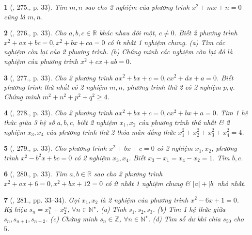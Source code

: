 \documentclass{article}
\newtheorem{baitoan}{}
\begin{document}
\begin{baitoan}[\cite{Binh_Toan_9_tap_2}, 275., p. 33]
	Tìm $m,n$ sao cho 2 nghiệm của phương trình $x^2 + mx + n = 0$ cũng là $m,n$.
\end{baitoan}

\begin{baitoan}[\cite{Binh_Toan_9_tap_2}, 276., p. 33]
	Cho $a,b,c\in\mathbb{R}$ khác nhau đôi một, $c\ne0$. Biết 2 phương trình $x^2 + ax + bc = 0,x^2 + bx + ca = 0$ có ít nhất 1 nghiệm chung. (a) Tìm các nghiệm còn lại của 2 phương trình. (b) Chứng minh các nghiệm còn lại đó là nghiệm của phương trình $x^2 + cx + ab = 0$.
\end{baitoan}

\begin{baitoan}[\cite{Binh_Toan_9_tap_2}, 277., p. 33]
	Cho 2 phương trình $ax^2 + bx + c = 0,cx^2 + dx + a = 0$. Biết phương trình thứ nhất có 2 nghiệm $m,n$, phương trình thứ 2 có 2 nghiệm $p,q$. Chứng minh $m^2 + n^2 + p^2 + q^2\ge4$.
\end{baitoan}

\begin{baitoan}[\cite{Binh_Toan_9_tap_2}, 278., p. 33]
	Cho 2 phương trình $ax^2 + bx + c = 0,cx^2 + bx + a = 0$. Tìm 1 hệ thức giữa 3 hệ số $a,b,c$, biết 2 nghiệm $x_1,x_2$ của phương trình thứ nhất \& 2 nghiệm $x_3,x_4$ của phương trình thứ 2 thỏa mãn đẳng thức $x_1^2 + x_2^2 + x_3^2 + x_4^2 = 4$.
\end{baitoan}

\begin{baitoan}[\cite{Binh_Toan_9_tap_2}, 279., p. 33]
	Cho phương trình $x^2 + bx + c = 0$ có 2 nghiệm $x_1,x_2$, phương trình $x^2 - b^2x + bc = 0$ có 2 nghiệm $x_3,x_4$. Biết $x_3 - x_1 = x_4 - x_2 = 1$. Tìm $b,c$.
\end{baitoan}

\begin{baitoan}[\cite{Binh_Toan_9_tap_2}, 280., p. 33]
	Tìm $a,b\in\mathbb{R}$ sao cho 2 phương trình $x^2 + ax + 6 = 0,x^2 + bx + 12 = 0$ có ít nhất 1 nghiệm chung \& $|a| + |b|$ nhỏ nhất.
\end{baitoan}

\begin{baitoan}[\cite{Binh_Toan_9_tap_2}, 281., pp. 33--34]
	Gọi $x_1,x_2$ là 2 nghiệm của phương trình $x^2 - 6x + 1 = 0$. Ký hiệu $s_n = x_1^n + x_2^n$, $\forall n\in\mathbb{N}^\star$. (a) Tính $s_1,s_2,s_3$. (b) Tìm 1 hệ thức giữa $s_n,s_{n+1},s_{n+2}$. (c) Chứng minh $s_n\in\mathbb{Z}$, $\forall n\in\mathbb{N}^\star$. (d) Tìm số dư khi chia $s_{50}$ cho $5$.
\end{baitoan}
\end{document}
